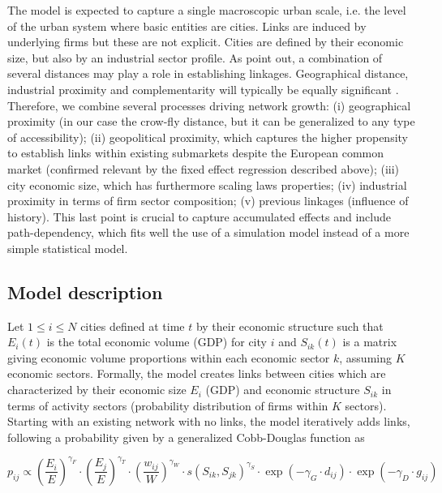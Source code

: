 \documentclass[11pt]{article}
\begin{document}
The model is expected to capture a single macroscopic urban scale, i.e. the level of the urban system where basic entities are cities. Links are induced by underlying firms but these are not explicit. Cities are defined by their economic size, but also by an industrial sector profile. As \cite{martinus2018global} point out, a combination of several distances may play a role in establishing linkages. Geographical distance, industrial proximity and complementarity will typically be equally significant \cite{cottineau2020nested}. Therefore, we combine several processes driving network growth: (i) geographical proximity (in our case the crow-fly distance, but it can be generalized to any type of accessibility); (ii) geopolitical proximity, which captures the higher propensity to establish links within existing submarkets despite the European common market (confirmed relevant by the fixed effect regression described above); (iii) city economic size, which has furthermore scaling laws properties; (iv) industrial proximity in terms of firm sector composition; (v) previous linkages (influence of history). This last point is crucial to capture accumulated effects and include path-dependency, which fits well the use of a simulation model instead of a more simple statistical model.



\subsection{Model description}

Let $1 \leq i \leq N$ cities defined at time $t$ by their economic structure such that $E_i(t)$ is the total economic volume (GDP) for city $i$ and $S_{ik}(t)$ is a matrix giving economic volume proportions within each economic sector $k$, assuming $K$ economic sectors. Formally, the model creates links between cities which are characterized by their economic size $E_i$ (GDP) and economic structure $S_{ik}$ in terms of activity sectors (probability distribution of firms within $K$ sectors). Starting with an existing network with no links, the model iteratively adds links, following a probability given by a generalized Cobb-Douglas function \cite{vilcu2011geometric} as 

\begin{equation}
p_{ij} \propto \left(\frac{E_{i}}{E}\right)^{\gamma_F} \cdot \left(\frac{E_{j}}{E}\right)^{\gamma_T} \cdot \left(\frac{w_{ij}}{W}\right)^{\gamma_W} \cdot s\left(S_{ik},S_{jk}\right)^{\gamma_S} \cdot \exp \left(- \gamma_G \cdot d_{ij}\right) \cdot \exp \left(- \gamma_D \cdot g_{ij}\right)
\end{equation}
\end{document}

